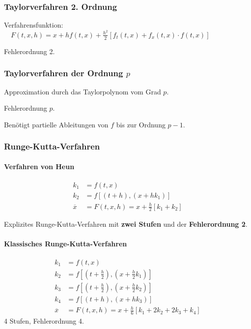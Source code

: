 		\subsubsection{Taylorverfahren 2. Ordnung}
			Verfahrensfunktion: $\quad F(t,x,h)=x + hf(t,x) + \frac{h^2}{2}\left[ f_t(t,x) + f_x(t,x)\cdot f(t,x)\right]$
			
			Fehlerordnung 2. 
			
		\subsubsection{Taylorverfahren der Ordnung $p$} 
			\begin{tightitemize}
				\item Approximation durch das Taylorpolynom vom Grad $p$. 
				\item Fehlerordnung $p$. 
				\item Benötigt partielle Ableitungen von $f$ bis zur Ordnung $p-1$. 
			\end{tightitemize}
			
		\subsubsection{Runge-Kutta-Verfahren} 
			\paragraph{Verfahren von Heun}
				\label{heun}
				\begin{align*}
					k_1 &= f(t,x) \\
					k_2 &= f\left[(t+h),(x+hk_1)\right] \\
					\overline{x} &= F(t,x,h)=x + \frac{h}{2}\left[ k_1 + k_2\right]
				\end{align*}
				
				Explizites Runge-Kutta-Verfahren mit \textbf{zwei Stufen} und der \textbf{Fehlerordnung 2}. 
				
			\paragraph{Klassisches Runge-Kutta-Verfahren}
				\begin{align*}
					k_1 &= f(t,x) \\
					k_2 &= f\left[ \left( t+\frac{h}{2}\right),\left( x + \frac{h}{2}k_1\right)\right] \\
					k_3 &= f\left[ \left( t+\frac{h}{2}\right),\left( x + \frac{h}{2}k_2\right)\right] \\
					k_4 &= f\left[ \left( t+h\right),\left( x + hk_3\right)\right] \\
					\overline{x} &= F(t,x,h)=x + \frac{h}{6}\left[ k_1 + 2k_2 + 2k_3 + k_4\right]
				\end{align*}
				4 Stufen, Fehlerordnung 4. 
				
